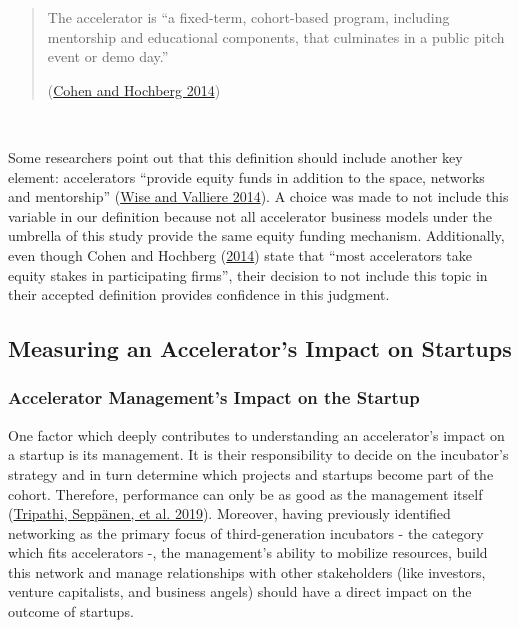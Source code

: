 \documentclass[
  12pt,
]{article}
\begin{document}
\begin{quote}
The accelerator is ``a fixed-term, cohort-based program, including mentorship and educational components, that culminates in a public pitch event or demo day.''

(\protect\hyperlink{ref-cohen_accelerating_2014}{Cohen and Hochberg 2014})
\end{quote}

~

Some researchers point out that this definition should include another key element: accelerators ``provide equity funds in addition to the space, networks and mentorship'' (\protect\hyperlink{ref-wise_impact_2014}{Wise and Valliere 2014}). A choice was made to not include this variable in our definition because not all accelerator business models under the umbrella of this study provide the same equity funding mechanism. Additionally, even though Cohen and Hochberg (\protect\hyperlink{ref-cohen_accelerating_2014}{2014}) state that ``most accelerators take equity stakes in participating firms'', their decision to not include this topic in their accepted definition provides confidence in this judgment.

\hypertarget{measuring-an-accelerators-impact-on-startups}{%
\subsection{Measuring an Accelerator's Impact on Startups}\label{measuring-an-accelerators-impact-on-startups}}

\hypertarget{reviewmanagementimpact}{%
\subsubsection{Accelerator Management's Impact on the Startup}\label{reviewmanagementimpact}}

One factor which deeply contributes to understanding an accelerator's impact on a startup is its management. It is their responsibility to decide on the incubator's strategy and in turn determine which projects and startups become part of the cohort. Therefore, performance can only be as good as the management itself (\protect\hyperlink{ref-tripathi_insights_2019}{Tripathi, Seppänen, et al. 2019}). Moreover, having previously identified networking as the primary focus of third-generation incubators - the category which fits accelerators -, the management's ability to mobilize resources, build this network and manage relationships with other stakeholders (like investors, venture capitalists, and business angels) should have a direct impact on the outcome of startups.
\end{document}
